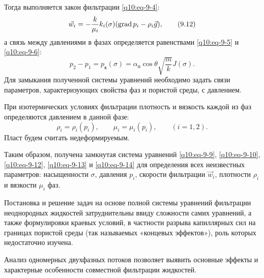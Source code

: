 Тогда выполняется закон фильтрации \eqref{q10:eq-9-4}:
\begin{equation}\vec w_i=-\frac{k}{\mu_i}k_i(\sigma)(\operatorname{grad} p_i-\rho_i\vec g),\tag{9.12}\label{q10:eq-9-12}\end{equation}
а связь между давлениями в фазах определяется равенствами \eqref{q10:eq-9-5} и \eqref{q10:eq-9-6}:
\begin{equation}p_2-p_1=p_\text{к}(\sigma)=\alpha_\text{п}\cos\theta\sqrt{\frac{m}{k}}J(\sigma).\tag{9.13}\label{q10:eq-9-13}\end{equation}
Для замыкания полученной системы уравнений необходимо задать связи параметров, характеризующих свойства фаз и пористой среды, с давлением.

При изотермических условиях фильтрации плотность и вязкость каждой из фаз определяются давлением в данной фазе:
\begin{equation}\rho_i=\rho_i(p_i),\qquad\mu_i=\mu_i(p_i),\qquad(i=1,2).\tag{9.14}\label{q10:eq-9-14}\end{equation}
Пласт будем считать недеформируемым.

Таким образом, получена замкнутая система уравнений \eqref{q10:eq-9-9}, \eqref{q10:eq-9-10}, \eqref{q10:eq-9-12}, \eqref{q10:eq-9-13} и \eqref{q10:eq-9-14} для определения всех неизвестных параметров: насыщенности $\sigma$, давления $p_i$, скорости фильтрации $\vec w_i$, плотности $\rho_i$ и вязкости $\mu_i$ фаз.

Постановка и решение задач на основе полной системы уравнений фильтрации неоднородных жидкостей затруднительны ввиду сложности самих уравнений, а также формулировки краевых условий, в частности разрыва капиллярных сил на границах пористой среды (так называемых «концевых эффектов»), роль которых недостаточно изучена.

Анализ одномерных двухфазных потоков позволяет выявить основные эффекты и характерные особенности совместной фильтрации жидкостей.
